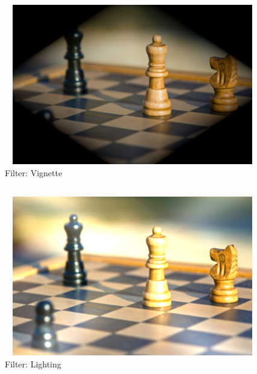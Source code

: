 \documentclass[12pt, a4]{article}
\begin{document}
\newpage
\subsection*{}
\begin{figure}[h]
\centering
\caption{Filter: Vignette}
\includegraphics[height=7cm, width=12cm]{Filters/Chess-Vignette.jpeg}
\end{figure}

\subsection*{}
\begin{figure}[h]
\centering
\caption{Filter: Lighting}
\includegraphics[height=7cm, width=12cm]{Filters/Chess-Lighting.jpeg}
\end{figure}

\newpage
\end{document}

